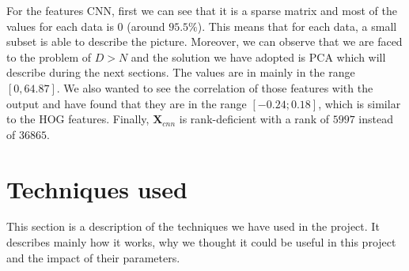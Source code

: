 \documentclass{article} %
\begin{document}
For the features CNN, first we can see that it is a sparse matrix and most of the values for each data is $0$ (around $95.5\%$). This means that for each data, a small subset is able to describe the picture. Moreover, we can observe that we are faced to the problem of $D > N$ and the solution we have adopted is PCA which will describe during the next sections. The values are in mainly in the range $[0, 64.87]$. We also wanted to see the correlation of those features with the output and have found that they are in the range $[-0.24;0.18]$, which is similar to the HOG features. Finally,  $\mathbf{X}_{cnn}$ is rank-deficient with a rank of $5997$ instead of $36865$.

\section{Techniques used}

This section is a description of the techniques we have used in the project. It describes mainly how it works, why we thought it could be useful in this project and the impact of their parameters.

\begin{figure}[!ht]
\center
{}
\hfill
{}
\hfill
\caption{}
\end{figure}
\end{document}

